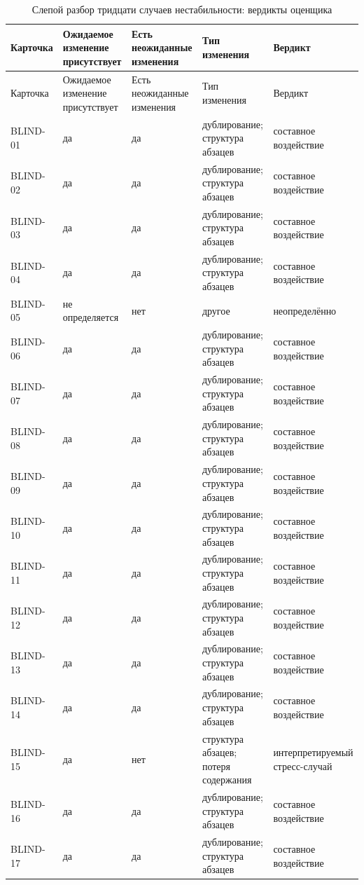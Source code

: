 \begingroup\scriptsize
\begin{longtable}{lllll}
\caption{Слепой разбор тридцати случаев нестабильности: вердикты оценщика}\label{tab:s10} \\
\toprule
Карточка & Ожидаемое изменение присутствует & Есть неожиданные изменения & Тип изменения & Вердикт \\
\midrule
\endfirsthead
\toprule
Карточка & Ожидаемое изменение присутствует & Есть неожиданные изменения & Тип изменения & Вердикт \\
\midrule
\endhead
\bottomrule
\endfoot
BLIND-01 & да & да & дублирование; структура абзацев & составное воздействие \\
BLIND-02 & да & да & дублирование; структура абзацев & составное воздействие \\
BLIND-03 & да & да & дублирование; структура абзацев & составное воздействие \\
BLIND-04 & да & да & дублирование; структура абзацев & составное воздействие \\
BLIND-05 & не определяется & нет & другое & неопределённо \\
BLIND-06 & да & да & дублирование; структура абзацев & составное воздействие \\
BLIND-07 & да & да & дублирование; структура абзацев & составное воздействие \\
BLIND-08 & да & да & дублирование; структура абзацев & составное воздействие \\
BLIND-09 & да & да & дублирование; структура абзацев & составное воздействие \\
BLIND-10 & да & да & дублирование; структура абзацев & составное воздействие \\
BLIND-11 & да & да & дублирование; структура абзацев & составное воздействие \\
BLIND-12 & да & да & дублирование; структура абзацев & составное воздействие \\
BLIND-13 & да & да & дублирование; структура абзацев & составное воздействие \\
BLIND-14 & да & да & дублирование; структура абзацев & составное воздействие \\
BLIND-15 & да & нет & структура абзацев; потеря содержания & интерпретируемый стресс-случай \\
BLIND-16 & да & да & дублирование; структура абзацев & составное воздействие \\
BLIND-17 & да & да & дублирование; структура абзацев & составное воздействие \\

\end{longtable}
